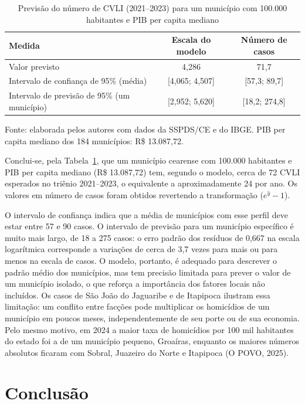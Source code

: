 \documentclass[12pt,a4paper]{article}
\newcommand{\fonte}[1]{
	\vspace{-2mm}
	\begin{center}\footnotesize Fonte: #1\end{center}
}
\newcommand{\fontedados}{elaborada pelos autores com dados da SSPDS/CE e do IBGE.}
\begin{document}
	\begin{table}[H]
		\centering
		\caption{Previsão do número de CVLI (2021--2023) para um município com 100.000 habitantes e PIB per capita mediano}
		\label{tab:previsao}
		\begin{tabular}{lcc}
			\toprule
			\textbf{Medida} & \textbf{Escala do modelo} & \textbf{Número de casos} \\
			\midrule
			Valor previsto                                 & 4,286            & 71,7 \\
			Intervalo de confiança de 95\% (média)         & [4,065; 4,507]   & [57,3; 89,7] \\
			Intervalo de previsão de 95\% (um município)   & [2,952; 5,620]   & [18,2; 274,8] \\
			\bottomrule
		\end{tabular}
	\end{table}
	\fonte{\fontedados{} PIB per capita mediano dos 184 municípios: R\$ 13.087,72.}
	
	Conclui-se, pela Tabela~\ref{tab:previsao}, que um município cearense com 100.000 habitantes e PIB per capita mediano (R\$ 13.087,72) tem, segundo o modelo, cerca de 72 CVLI esperados no triênio 2021--2023, o equivalente a aproximadamente 24 por ano. Os valores em número de casos foram obtidos revertendo a transformação ($e^{\hat{y}} - 1$).
	
	O intervalo de confiança indica que a média de municípios com esse perfil deve estar entre 57 e 90 casos. O intervalo de previsão para um município específico é muito mais largo, de 18 a 275 casos: o erro padrão dos resíduos de 0,667 na escala logarítmica corresponde a variações de cerca de 3,7 vezes para mais ou para menos na escala de casos. O modelo, portanto, é adequado para descrever o padrão médio dos municípios, mas tem precisão limitada para prever o valor de um município isolado, o que reforça a importância dos fatores locais não incluídos. Os casos de São João do Jaguaribe e de Itapipoca ilustram essa limitação: um conflito entre facções pode multiplicar os homicídios de um município em poucos meses, independentemente de seu porte ou de sua economia. Pelo mesmo motivo, em 2024 a maior taxa de homicídios por 100 mil habitantes do estado foi a de um município pequeno, Groaíras, enquanto os maiores números absolutos ficaram com Sobral, Juazeiro do Norte e Itapipoca (O POVO, 2025).
	
	\newpage
	
	\section{Conclusão}
	
\end{document}
